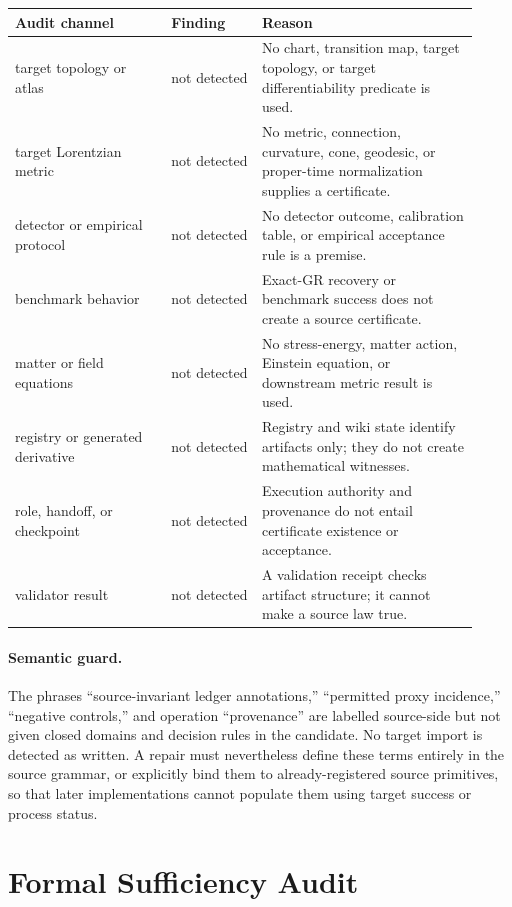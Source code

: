 \documentclass[11pt]{article}
\begin{document}
\begin{longtable}{p{0.31\linewidth}p{0.18\linewidth}p{0.43\linewidth}}
\toprule
Audit channel & Finding & Reason \\
\midrule
target topology or atlas & not detected & No chart, transition map, target topology, or target differentiability predicate is used. \\
target Lorentzian metric & not detected & No metric, connection, curvature, cone, geodesic, or proper-time normalization supplies a certificate. \\
detector or empirical protocol & not detected & No detector outcome, calibration table, or empirical acceptance rule is a premise. \\
benchmark behavior & not detected & Exact-GR recovery or benchmark success does not create a source certificate. \\
matter or field equations & not detected & No stress-energy, matter action, Einstein equation, or downstream metric result is used. \\
registry or generated derivative & not detected & Registry and wiki state identify artifacts only; they do not create mathematical witnesses. \\
role, handoff, or checkpoint & not detected & Execution authority and provenance do not entail certificate existence or acceptance. \\
validator result & not detected & A validation receipt checks artifact structure; it cannot make a source law true. \\
\bottomrule
\end{longtable}

\paragraph{Semantic guard.}
The phrases ``source-invariant ledger annotations,'' ``permitted proxy incidence,''
``negative controls,'' and operation ``provenance'' are labelled
source-side but not given closed domains and decision rules in the candidate.
No target import is detected as written. A repair must nevertheless define
these terms entirely in the source grammar, or explicitly bind them to
already-registered source primitives, so that later implementations cannot
populate them using target success or process status.

\section{Formal Sufficiency Audit}
\end{document}
